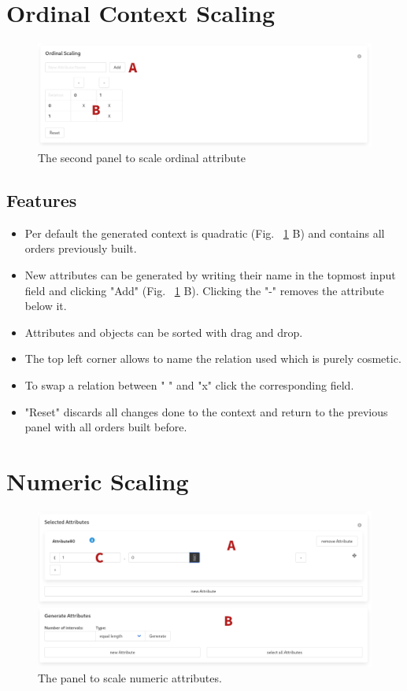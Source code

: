 \documentclass[]{article}
\begin{document}
\section{Ordinal Context Scaling}
\begin{figure}[H]
	\includegraphics[width=\linewidth]{images/ordinal_ctx.png}
	\caption{The second panel to scale ordinal attribute}
	\label{fig:p6}
\end{figure}
\subsection{Features}
\begin{itemize}
    \item Per default the generated context is quadratic (Fig. ~\ref{fig:p6} B) and contains all orders previously built.
    \item New attributes can be generated by writing their name in the topmost input field and clicking "Add" (Fig. ~\ref{fig:p6} B). Clicking the "-" removes the attribute below it.
    \item Attributes and objects can be sorted with drag and drop.
    \item The top left corner allows to name the relation used which is purely cosmetic.
    \item To swap a relation between " " and "x" click the corresponding field.
    \item "Reset" discards all changes done to the context and return to the previous panel with all orders built before.
\end{itemize}

\section{Numeric Scaling}
\begin{figure}[H]
	\includegraphics[width=\linewidth]{images/numeric.png}
	\caption{The panel to scale numeric attributes.}
	\label{fig:p7}
\end{figure}
\end{document}
